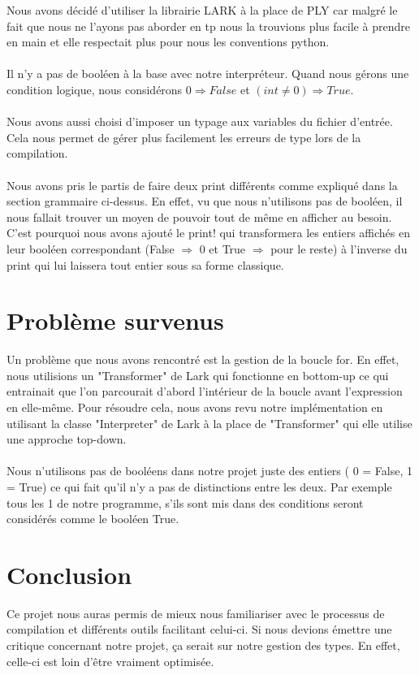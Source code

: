 \documentclass[a4paper, 12pt]{article}
\begin{document}
Nous avons décidé d'utiliser la librairie LARK à la place de PLY car malgré le fait que nous ne l'ayons pas aborder en tp nous la trouvions plus facile à prendre en main et elle respectait plus pour nous les conventions python. \\
\\
Il n'y a pas de booléen à la base avec notre interpréteur. Quand nous gérons une condition logique, nous considérons $ 0 \Rightarrow False$ et $ (int \neq 0) \Rightarrow True$. \\
\\
Nous avons aussi choisi d'imposer un typage aux variables du fichier d'entrée. Cela nous permet de gérer plus facilement les erreurs de type lors de la compilation.\\
\\
Nous avons pris le partis de faire deux print différents comme expliqué dans la section grammaire ci-dessus. En effet, vu que nous n'utilisons pas de booléen, il nous fallait trouver un moyen de pouvoir tout de même en afficher au besoin. C'est pourquoi nous avons ajouté le print! qui transformera les entiers affichés en leur booléen correspondant (False $ \Rightarrow $ 0 et True $ \Rightarrow $ pour le reste) à l'inverse du print qui lui laissera tout entier sous sa forme classique.

\section{Problème survenus}

Un problème que nous avons rencontré est la gestion de la boucle for. En effet, nous utilisions un "Transformer" de Lark qui fonctionne en bottom-up ce qui entrainait que l'on parcourait d'abord l'intérieur de la boucle avant l'expression en elle-même. Pour résoudre cela, nous avons revu notre implémentation en utilisant la classe "Interpreter" de Lark à la place de "Transformer" qui elle utilise une approche top-down.\\
\\
Nous n'utilisons pas de booléens dans notre projet juste des entiers ( 0 = False, 1 = True) ce qui fait qu'il n'y a pas de distinctions entre les deux. Par exemple tous les 1 de notre programme, s'ils sont mis dans des conditions seront considérés comme le booléen True.



\section{Conclusion}

Ce projet nous auras permis de mieux nous familiariser avec le processus de compilation et différents outils facilitant celui-ci. Si nous devions émettre une critique concernant notre projet, ça serait sur notre gestion des types. En effet, celle-ci est loin d'être vraiment optimisée.
\end{document}
